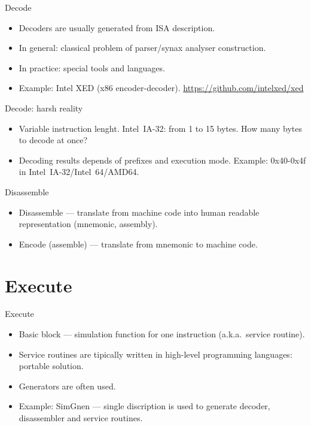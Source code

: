\begin{frame}{Decode}
\begin{itemize}
\item Decoders are usually generated from ISA description.
\item In general: classical problem of parser/synax analyser construction.
\item In practice: special tools and languages.
\item Example: Intel XED (x86 encoder-decoder). \url{https://github.com/intelxed/xed}
\end{itemize}
\end{frame}

\begin{frame}{Decode: harsh reality}
\begin{itemize}
\item Variable instruction lenght. Intel\reg~IA-32: from 1 to 15 bytes. How many bytes to decode at once?
\item Decoding results depends of prefixes and execution mode. Example: 0x40-0x4f in Intel\reg~IA-32/Intel\reg~64/AMD64.
\end{itemize}
\end{frame}

\begin{frame}{Disassemble}
\begin{itemize}
\item Disassemble --- translate from machine code into human readable
  representation (mnemonic, assembly).
\item Encode (assemble) --- translate from mnemonic to machine code.
\end{itemize}
\end{frame}

\section{Execute}

\begin{frame}{Execute}
\begin{itemize}
\item Basic block --- simulation function for one instruction (a.k.a.~service routine).
\item Service routines are tipically written in high-level programming
  languages: portable solution.
\item Generators are often used.
\item Example: SimGnen --- single discription is used to generate decoder,
  disassembler and service routines.
\end{itemize}
\end{frame}


